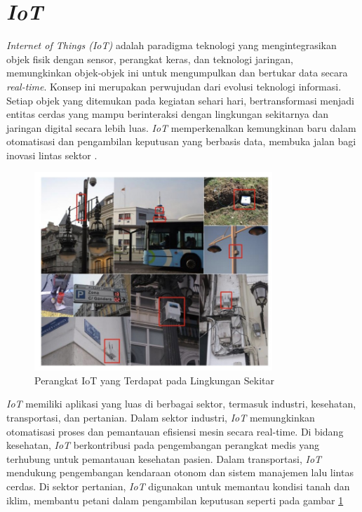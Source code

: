 \section{\textit{IoT}}

\textit{Internet of Things (IoT)} adalah paradigma teknologi yang mengintegrasikan objek fisik dengan sensor, perangkat keras, dan teknologi jaringan, memungkinkan objek-objek ini untuk mengumpulkan dan bertukar data secara \textit{real-time}. Konsep ini merupakan perwujudan dari evolusi teknologi informasi. Setiap objek yang ditemukan pada kegiatan sehari hari, bertransformasi menjadi entitas cerdas yang mampu berinteraksi dengan lingkungan sekitarnya dan jaringan digital secara lebih luas. \textit{IoT} memperkenalkan kemungkinan baru dalam otomatisasi dan pengambilan keputusan yang berbasis data, membuka jalan bagi inovasi lintas sektor \parencite{madakam2015internet}.

\begin{figure}[ht]
  \centering
  \includegraphics[width=0.8\textwidth]{resources/chapter-2/gambar-iot.jpg}
  \caption{Perangkat IoT yang Terdapat pada Lingkungan Sekitar \parencite{sotres2017practical}}
  \label{fig:iot-kehidupan-sehari-hari}
\end{figure}

\textit{IoT} memiliki aplikasi yang luas di berbagai sektor, termasuk industri, kesehatan, transportasi, dan pertanian. Dalam sektor industri, \textit{IoT} memungkinkan otomatisasi proses dan pemantauan efisiensi mesin secara real-time. Di bidang kesehatan, \textit{IoT} berkontribusi pada pengembangan perangkat medis yang terhubung untuk pemantauan kesehatan pasien. Dalam transportasi, \textit{IoT} mendukung pengembangan kendaraan otonom dan sistem manajemen lalu lintas cerdas. Di sektor pertanian, \textit{IoT} digunakan untuk memantau kondisi tanah dan iklim, membantu petani dalam pengambilan keputusan seperti pada gambar \ref{fig:iot-kehidupan-sehari-hari}

